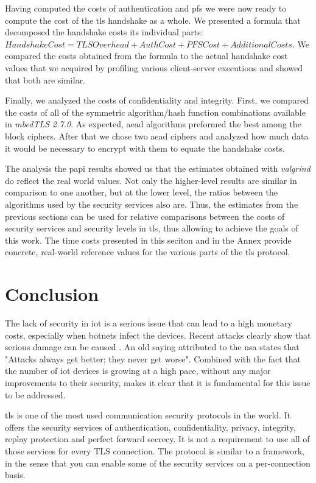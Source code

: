 \documentclass{llncs}
\begin{document}
Having computed the costs of authentication and \gls{pfs} we were now ready to compute the cost of the \gls{tls} handshake
as a whole. We presented a formula that decomposed the handshake costs its individual parts: $Handshake Cost = TLS Overhead + Auth Cost + PFS Cost + Additional Costs$. 
We compared the costs
obtained from the formula to the actual handshake cost values that we acquired by profiling various client-server
executions and showed that both are similar.

Finally, we analyzed the costs of confidentiality and integrity. First, we compared the costs of all of the
symmetric algorithm/hash function combinations available in \textit{mbedTLS 2.7.0}. As expected,
\gls{aead} algorithms preformed the best among the block ciphers. After that we chose two \gls{aead} ciphers and
analyzed how much data it would be necessary to encrypt with them to equate the handshake costs.

The analysis the \gls{papi} results showed us that the estimates obtained with \textit{valgrind} do reflect the real world values. 
Not only the higher-level results are similar in comparison to one another, but at the lower level, the ratios between the algorithms 
used by the security services also are. Thus, the estimates from the previous sections can be used for relative comparisons between the 
costs of security services and security levels in \gls{tls}, thus allowing to achieve the goals of this work. The time costs presented in 
this seciton and in the Annex provide concrete, real-world reference values for the various parts of the \gls{tls} protocol.

\section{Conclusion}

The lack of security in \gls{iot} is a serious issue that can lead to a high monetary costs,
especially when botnets infect the devices. Recent
attacks clearly show that serious damage can be caused \cite{sec17ant94:online}. An old saying attributed to the
\gls{nsa} states that "Attacks always get better; they never get worse".
Combined with the fact that the number of \gls{iot} devices is growing at a high
pace, without any major improvements to their security, makes it clear
that it is fundamental for this issue to be addressed.

\gls{tls} is one of the most used communication security protocols in the world. It offers the
security services of authentication, confidentiality, privacy, integrity, replay
protection and perfect forward secrecy. It is not a requirement to use all of
those services for every TLS connection. The protocol is similar to
a framework, in the sense that you can enable some of the security
services on a per-connection basis.
\end{document}
